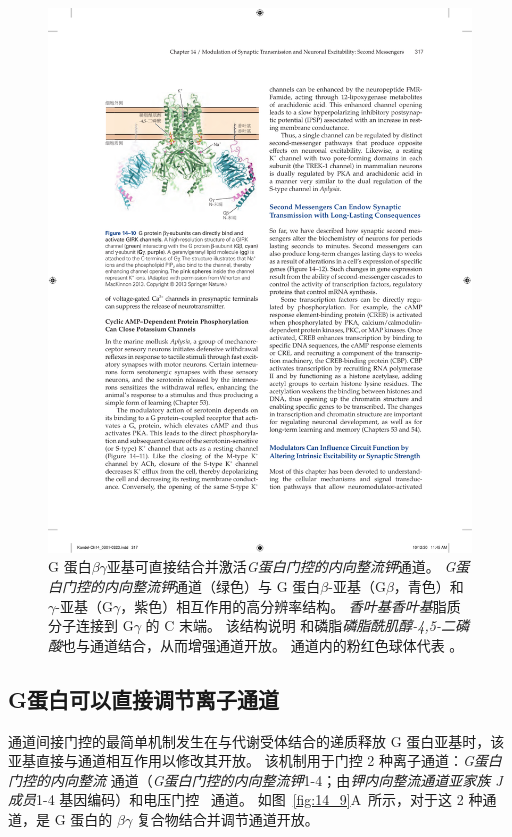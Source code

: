 \begin{figure}[htbp]
	\centering
	\includegraphics[width=0.65\linewidth]{chap14/fig_14_10}
	\caption{G 蛋白$\beta\gamma$亚基可直接结合并激活\textit{G蛋白门控的内向整流钾}通道。
		\textit{G蛋白门控的内向整流钾}通道（绿色）与 G 蛋白$\beta$-亚基（G$\beta$，青色）和 $\gamma$-亚基（G$\gamma$，紫色）相互作用的高分辨率结构。
		\textit{香叶基香叶基}脂质分子连接到 G$\gamma$ 的 C 末端。
		该结构说明  和磷脂\textit{磷脂酰肌醇-4,5-二磷酸}也与通道结合，从而增强通道开放。
		通道内的粉红色球体代表 \cite{whorton2013x}。}
	\label{fig:14_10}
\end{figure}



\subsection{G蛋白可以直接调节离子通道}

通道间接门控的最简单机制发生在与代谢受体结合的递质释放 G 蛋白亚基时，该亚基直接与通道相互作用以修改其开放。
该机制用于门控 2 种离子通道：\textit{G蛋白门控的内向整流}  通道（\textit{G蛋白门控的内向整流钾}1-4；由\textit{钾内向整流通道亚家族 J 成员}1-4 基因编码）和电压门控~ 通道。
如图~\ref{fig:14_9}A~所示，对于这 2 种通道，是 G 蛋白的 $\beta \gamma$ 复合物结合并调节通道开放。


